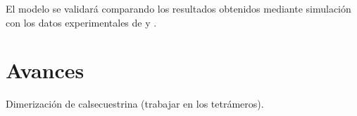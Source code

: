\documentclass[draft]{article}
\begin{document}
El modelo se validará comparando los resultados obtenidos mediante simulación con los datos experimentales de \cite{Guerrero-Hernandez2010} y \cite{Perez-Rosas2015}.
\section{Avances}

Dimerización de calsecuestrina (trabajar en los tetrámeros).






 


\end{document}
